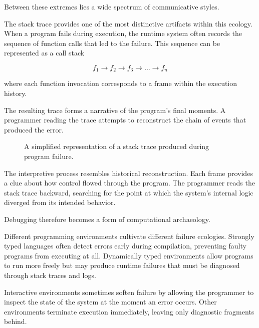 \documentclass[11pt]{article}
\theoremstyle{definition}
\begin{document}
Between these extremes lies a wide spectrum of communicative styles.

The stack trace provides one of the most distinctive artifacts within
this ecology. When a program fails during execution, the runtime system
often records the sequence of function calls that led to the failure.
This sequence can be represented as a call stack

\[
f_1 \rightarrow f_2 \rightarrow f_3 \rightarrow \dots \rightarrow f_n
\]

where each function invocation corresponds to a frame within the
execution history.

The resulting trace forms a narrative of the program's final moments.
A programmer reading the trace attempts to reconstruct the chain of
events that produced the error.

\begin{figure}[h]
\centering
{}
\caption{A simplified representation of a stack trace produced during
program failure.}
\end{figure}

The interpretive process resembles historical reconstruction. Each
frame provides a clue about how control flowed through the program.
The programmer reads the stack trace backward, searching for the point
at which the system's internal logic diverged from its intended
behavior.

Debugging therefore becomes a form of computational archaeology.

Different programming environments cultivate different failure
ecologies. Strongly typed languages often detect errors early during
compilation, preventing faulty programs from executing at all.
Dynamically typed environments allow programs to run more freely but
may produce runtime failures that must be diagnosed through stack
traces and logs.

Interactive environments sometimes soften failure by allowing the
programmer to inspect the state of the system at the moment an error
occurs. Other environments terminate execution immediately, leaving
only diagnostic fragments behind.
\end{document}
